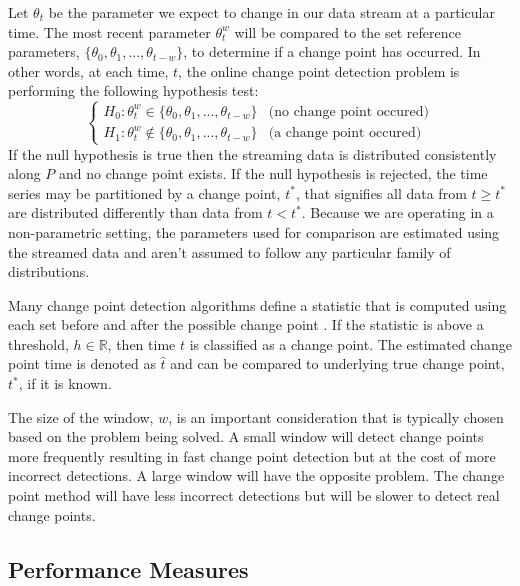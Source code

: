 Let $\theta_t$ be the parameter we expect to change in our data stream at a particular time. The most recent parameter $\theta_t^w$ will be compared to the set reference parameters, $\{\theta_0, \theta_1,...,\theta_{t-w}\}$, to determine if a change point has occurred. In other words, at each time, $t$, the online change point detection problem is performing the following hypothesis test:
\begin{equation}
\label{formula_cpd}
  \begin{cases}
    H_0: \theta_t^w \in \{\theta_0, \theta_1,...,\theta_{t-w}\}  & \text{(no change point occured)} \\
    H_1: \theta_t^w \notin \{\theta_0, \theta_1,...,\theta_{t-w}\}  & \text{(a change point occured)}
  \end{cases}
\end{equation}
If the null hypothesis is true then the streaming data is distributed consistently along $P$ and no change point exists. If the null hypothesis is rejected, the time series may be partitioned by a change point, $t^*$, that signifies all data from $t \geq t^*$ are distributed differently than data from $t<t^*$. Because we are operating in a non-parametric setting, the parameters used for comparison are estimated using the streamed data and aren't assumed to follow any particular family of distributions. 

Many change point detection algorithms define a statistic that is computed using each set before and after the possible change point \cite{aminikhanghahi2017survey}. If the statistic is above a threshold, $h \in \mathbb{R}$, then time $t$ is classified as a change point. The estimated change point time is denoted as $\hat{t}$ and can be compared to underlying true change point, $t^*$, if it is known.

The size of the window, $w$, is an important consideration that is typically chosen based on the problem being solved. A small  window will detect change points more frequently resulting in fast change point detection but at the cost of more incorrect detections. A large window will have the opposite problem. The change point method will have less incorrect detections but will be slower to detect real change points.

\subsection{Performance Measures}
\label{perf}


